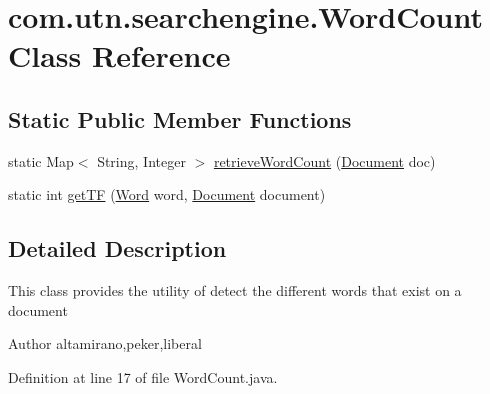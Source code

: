 \hypertarget{classcom_1_1utn_1_1searchengine_1_1_word_count}{\section{com.\-utn.\-searchengine.\-Word\-Count \-Class \-Reference}
\label{classcom_1_1utn_1_1searchengine_1_1_word_count}
}
\subsection*{\-Static \-Public \-Member \-Functions}
\begin{DoxyCompactItemize}
\item 
static \-Map$<$ \-String, \-Integer $>$ \hyperlink{classcom_1_1utn_1_1searchengine_1_1_word_count_a6844e58166eaeaf8830e9333b6e54d3d}{retrieve\-Word\-Count} (\hyperlink{classcom_1_1utn_1_1searchengine_1_1_document}{\-Document} doc)
\item 
static int \hyperlink{classcom_1_1utn_1_1searchengine_1_1_word_count_a460ac30e0a831c1119ba047c91da0a15}{get\-T\-F} (\hyperlink{classcom_1_1utn_1_1searchengine_1_1_word}{\-Word} word, \hyperlink{classcom_1_1utn_1_1searchengine_1_1_document}{\-Document} document)
\end{DoxyCompactItemize}


\subsection{\-Detailed \-Description}
\-This class provides the utility of detect the different words that exist on a document \begin{DoxyAuthor}{\-Author}
altamirano,peker,liberal 
\end{DoxyAuthor}


\-Definition at line 17 of file \-Word\-Count.\-java.



